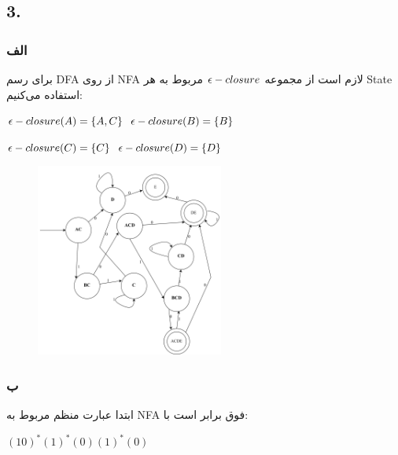 \subsection*{3.}
\subsubsection*{الف}
برای رسم DFA از روی NFA لازم است از مجموعه ${\LARGE \epsilon} - closure$ مربوط به هر State استفاده می‌کنیم:

\setLTR

${\LARGE \epsilon} - closure(A)= \left\{A,C\right\}$ \hspace{1em} ${\LARGE \epsilon} - closure(B)= \left\{B\right\}$ 

${\LARGE \epsilon} - closure(C)=\left\{C\right\}$  \hspace{1.9em}  ${\LARGE \epsilon} - closure(D)= \left\{D\right\}$ 

\setRTL

\begin{figure}[htbp]
	\centering
	\includegraphics[width=0.55\textwidth]{q3s3p1.png}
\end{figure}

\subsubsection*{ب}
ابتدا عبارت منظم مربوط به NFA فوق برابر است با:

\setLTR

 \textbf{$(10)^*(1)^*(0)(1)^*(0)$}
 
\setRTL



























